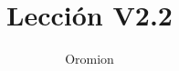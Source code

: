 \documentclass[10pt]{article}
\author{Oromion}
\title{Lección V2.2}
\begin{document}
\maketitle

\begin{abstract}
	\lipsum[1-6]
\end{abstract}

\begin{landscape}
	\lipsum[3]
\end{landscape}
\end{document}

